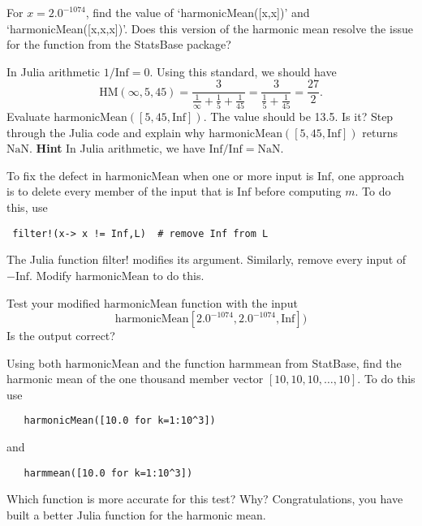 \documentclass[12pt,fleqn]{exam}
\newcommand{\HM}{\mathrm{HM}}
\newcommand{\Inf}{\mathrm{Inf}}
\begin{document}
\begin{questions}  
\question[1] For $x = 2.0^{-1074}$, find the value of `harmonicMean([x,x])'  and `harmonicMean([x,x,x])'. Does this
version of the harmonic mean resolve the issue for the function from the StatsBase package?


\question[1] In Julia arithmetic $1/\Inf = 0$.  Using this standard, we should have
  \begin{equation*}
  \HM(\infty, 5,45) = \frac{3}{\frac{1}{\infty} +  \frac{1}{5} + \frac{1}{45} } =
                           \frac{3}{\frac{1}{5} + \frac{1}{45} }
                           = \frac{27}{2}.
\end{equation*}
Evaluate $\mathrm{harmonicMean}([5,45,\Inf])$. The value should be 13.5. Is it?  Step through the Julia code and
explain why $\mathrm{harmonicMean}([5,45,\Inf])$ returns $\mathrm{NaN}$.  \textbf{Hint}  In Julia arithmetic,
we have $\Inf/\Inf = \mathrm{NaN}$.

\question [1] To fix the defect in $\mathrm{harmonicMean}$ when one or more input is $\Inf$, one approach is to
delete every member of the input that is $\Inf$ before computing $m$. To do this, use
\begin{verbatim}
 filter!(x-> x != Inf,L)  # remove Inf from L
\end{verbatim}
The Julia function filter! modifies its argument. Similarly, remove every input of $-\Inf$. Modify  $\mathrm{harmonicMean}$  to do this.

\question [1] Test your modified  $\mathrm{harmonicMean}$  function with the input  
\begin{equation}
 \mathrm{harmonicMean}[2.0^{-1074},2.0^{-1074}, \Inf])
 \end{equation}
  Is the output correct? 

\question [1] Using both $\mathrm{harmonicMean}$ and the function $\mathrm{harmmean}$ from StatBase,
find the harmonic mean of the one thousand member vector $[10,10, 10, \dots, 10]$. To do this use
\begin{verbatim}
   harmonicMean([10.0 for k=1:10^3])
\end{verbatim}
and
\begin{verbatim}
   harmmean([10.0 for k=1:10^3])
\end{verbatim}
Which function is more accurate for this test? Why? Congratulations, you have built a better Julia function for the harmonic mean.

\end{questions}
\end{document}
